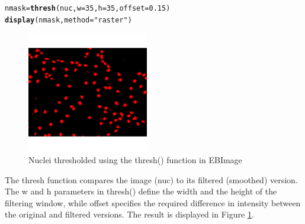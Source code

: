 \documentclass{article}\usepackage[]{graphicx}\usepackage[]{color}
\makeatletter
\newcommand{\hlnum}[1]{\textcolor[rgb]{0.686,0.059,0.569}{#1}}%
\newcommand{\hlstr}[1]{\textcolor[rgb]{0.192,0.494,0.8}{#1}}%
\newcommand{\hlstd}[1]{\textcolor[rgb]{0.345,0.345,0.345}{#1}}%
\newcommand{\hlkwb}[1]{\textcolor[rgb]{0.69,0.353,0.396}{#1}}%
\newcommand{\hlkwc}[1]{\textcolor[rgb]{0.333,0.667,0.333}{#1}}%
\newcommand{\hlkwd}[1]{\textcolor[rgb]{0.737,0.353,0.396}{\textbf{#1}}}%
\newenvironment{kframe}{%
 \def\at@end@of@kframe{}%
 \ifinner\ifhmode%
  \def\at@end@of@kframe{\end{minipage}}%
  \begin{minipage}{\columnwidth}%
 \fi\fi%
 \def\FrameCommand##1{\hskip\@totalleftmargin \hskip-\fboxsep
 \colorbox{shadecolor}{##1}\hskip-\fboxsep
     \hskip-\linewidth \hskip-\@totalleftmargin \hskip\columnwidth}%
 \MakeFramed {\advance\hsize-\width
   \@totalleftmargin\z@ \linewidth\hsize
   \@setminipage}}%
 {\par\unskip\endMakeFramed%
 \at@end@of@kframe}
\newenvironment{knitrout}{}{} %
\makeatother
\begin{document}
\begin{knitrout}
\color{fgcolor}\begin{kframe}
\begin{alltt}
\hlstd{nmask} \hlkwb{=} \hlkwd{thresh}\hlstd{(nuc,} \hlkwc{w}\hlstd{=}\hlnum{35}\hlstd{,} \hlkwc{h}\hlstd{=}\hlnum{35}\hlstd{,} \hlkwc{offset}\hlstd{=}\hlnum{0.15}\hlstd{)}
\hlkwd{display}\hlstd{(nmask,} \hlkwc{method}\hlstd{=}\hlstr{"raster"}\hlstd{)}
\end{alltt}
\end{kframe}\begin{figure}

{\centering \includegraphics[width=200px]{knit_figure/figthr-1} 

}

\caption[Nuclei thresholded using the thresh() function in EBImage]{Nuclei thresholded using the thresh() function in EBImage}\label{fig:thr}
\end{figure}


\end{knitrout}
The thresh function compares the image (nuc) to its filtered (smoothed) version. The w and h parameters in thresh() define the width and the height of the filtering window, while offset specifies the required difference in intensity between the original and filtered versions. The result is displayed in Figure \ref{fig:thr}.
\end{document}
